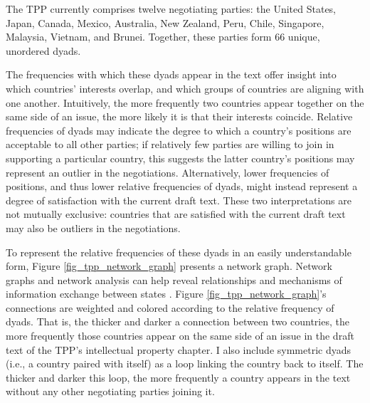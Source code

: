\documentclass[12pt]{article}
\begin{document}
The TPP currently comprises twelve negotiating parties: the United States, Japan, Canada, Mexico, 
Australia, New Zealand, Peru, Chile, Singapore, Malaysia, Vietnam, and Brunei. Together, 
these parties form 66 unique, unordered dyads. 

The frequencies with which these dyads appear in the text offer insight into which countries' interests overlap, 
and which groups of countries are 
aligning with one another. Intuitively, the more frequently two countries appear together on the same 
side of an issue, the more likely it is that their interests coincide. Relative frequencies of 
dyads may indicate the degree to which a country's positions are acceptable to all other parties; if relatively 
few parties are willing to join in supporting a particular country, this suggests the latter country's 
positions may represent an outlier in the negotiations. Alternatively, lower frequencies of positions, 
and thus lower relative frequencies of dyads, might instead represent a degree of satisfaction with 
the current draft text. These two interpretations are not mutually exclusive: countries that are 
satisfied with the current draft text may also be outliers in the negotiations.

To represent the relative frequencies of these dyads in an easily understandable form, 
Figure \ref{fig_tpp_network_graph} presents a network graph. Network graphs and network analysis can help reveal relationships and mechanisms of information exchange between states \citep{kinne2013network}.
Figure \ref{fig_tpp_network_graph}'s connections are weighted and colored 
according to the relative frequency of dyads. That is, the thicker and darker a connection between 
two countries, the more frequently those countries appear on the same side of an issue in the draft 
text of the TPP's intellectual property chapter. I also include symmetric dyads (i.e., a country paired with itself) as a loop linking the country back to itself. The thicker and darker this loop, the more frequently a country appears in 
the text without any other negotiating parties joining it.
\end{document}
